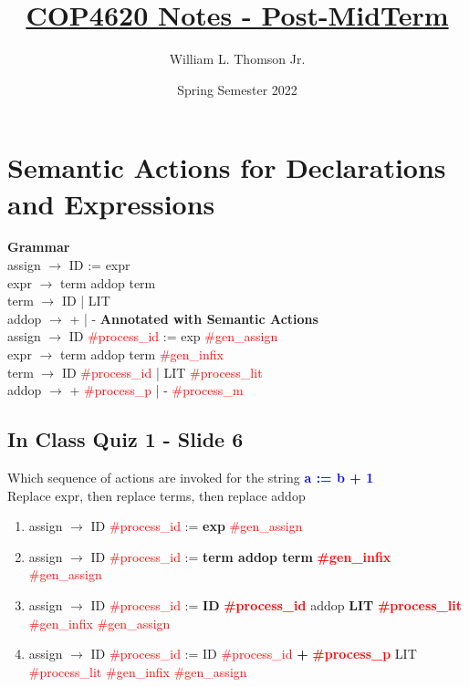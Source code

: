 \documentclass{report}
\title{\vspace{-50pt}\textbf{\underline{COP4620 Notes - Post-MidTerm}}}
\author{William L. Thomson Jr.}
\date{Spring Semester 2022}
\newcommand{\textb}[1]{\textcolor{blue}{#1}}
\newcommand{\textr}[1]{\textcolor{red}{#1}}
\newcommand{\textbfb}[1]{\textbf{\textb{#1}}}
\newcommand{\textbfr}[1]{\textbf{\textr{#1}}}
\begin{document}
\maketitle
\tableofcontents

\setcounter{chapter}{3}
\chapter{Semantic Actions for Declarations and Expressions}
\vspace{-1em}
\begin{multicols}{2}
\textbf{Grammar} \\
assign $\rightarrow$ ID := expr \\
expr   \hspace{.7em}$\rightarrow$ term addop term \\
term   \hspace{.6em}$\rightarrow$ ID | LIT \\
addop  $\rightarrow$ + | -
\vfill\columnbreak
\textbf{Annotated with Semantic Actions} \\
assign $\rightarrow$ ID \textr{\#process\_id} := exp \textr{\#gen\_assign} \\
expr   \hspace{.7em}$\rightarrow$ term addop term \textr{\#gen\_infix} \\
term   \hspace{.6em}$\rightarrow$ ID \textr{\#process\_id} | LIT \textr{\#process\_lit} \\
addop  $\rightarrow$  + \textr{\#process\_p} | - \textr{\#process\_m}
\end{multicols}
\vspace{-2em}


\section{In Class Quiz 1 - Slide 6}
Which sequence of actions are invoked for the string \textbfb{a := b + 1} \\
Replace expr, then replace terms, then replace addop
\begin{enumerate}
  \item assign $\rightarrow$ ID \textr{\#process\_id} := \textbf{exp} \textr{\#gen\_assign}
  \item assign $\rightarrow$ ID \textr{\#process\_id} := \textbf{term addop term} \textbfr{\#gen\_infix} \textr{\#gen\_assign}
  \item assign $\rightarrow$ ID \textr{\#process\_id} := \textbf{ID} \textbfr{\#process\_id} addop \textbf{LIT} \textbfr{\#process\_lit} \textr{\#gen\_infix} \textr{\#gen\_assign} 
  \item assign \hspace{.1em}$\rightarrow$ ID \textr{\#process\_id} := ID \textr{\#process\_id} \textbf{+} \textbfr{\#process\_p} LIT \textr{\#process\_lit} \textr{\#gen\_infix} \textr{\#gen\_assign} 
\end{enumerate}
\end{document}
